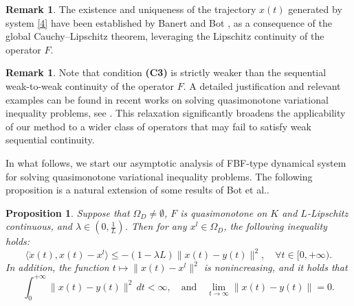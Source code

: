 \documentclass[hidelinks,11 pt]{article}
\numberwithin{equation}{section}
\newtheorem{proposition}[theorem]{Proposition}
\theoremstyle{definition}  %
\newtheorem{remark}[theorem]{Remark}
\numberwithin{equation}{section}
\numberwithin{theorem}{section}
\begin{document}
\begin{remark}
 The existence and uniqueness of the trajectory \(x(t)\) generated by system \eqref{4} have been established by Banert and Bot \cite{a23}, as a consequence of the global Cauchy–Lipschitz theorem, leveraging the Lipschitz continuity of the operator \(F\).
\end{remark}
\begin{remark}
    Note that condition \textbf{(C3)} is strictly weaker than the sequential weak-to-weak continuity of the operator \(F\). A detailed justification and relevant examples can be found in recent works on solving quasimonotone variational inequality problems, see \cite{a24}. This relaxation significantly broadens the applicability of our method to a wider class of operators that may fail to satisfy weak sequential continuity.
\end{remark}
In what follows, we start our asymptotic analysis of FBF-type dynamical system for solving quasimonotone variational inequality problems. The following proposition is a natural extension of some results of Bot et al.\cite{a22}. 
\begin{proposition}\label{p3.4}
    Suppose that $\Omega_{D} \neq \emptyset$, $F$ is quasimonotone on $K$ and $L$-Lipschitz continuous, and $\lambda\in(0,\frac{1}{L})$. Then for any $x^l \in \Omega_{D}$, the following inequality holds:
    \begin{equation}
        \langle \dot{x}(t), x(t) - x^l \rangle \leq -\left(1 -\lambda L\right) \|x(t) - y(t)\|^2, \quad \forall t \in [0,+\infty).
    \end{equation}
    In addition, the function $t \mapsto \|x(t) - x^l\|^2$ is nonincreasing, and it holds that
    \begin{equation*}
        \int_0^{+\infty} \|x(t) - y(t)\|^2 \, dt < \infty, \quad \text{and} \quad \lim_{t\to\infty}\|x(t)-y(t)\|=0.
    \end{equation*}
\end{proposition}
\end{document}
